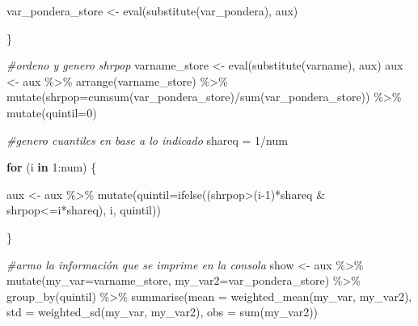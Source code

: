 \documentclass[
]{book}
\newenvironment{Shaded}{\begin{snugshade}}{\end{snugshade}}
\newcommand{\AttributeTok}[1]{\textcolor[rgb]{0.77,0.63,0.00}{#1}}
\newcommand{\CommentTok}[1]{\textcolor[rgb]{0.56,0.35,0.01}{\textit{#1}}}
\newcommand{\ControlFlowTok}[1]{\textcolor[rgb]{0.13,0.29,0.53}{\textbf{#1}}}
\newcommand{\DecValTok}[1]{\textcolor[rgb]{0.00,0.00,0.81}{#1}}
\newcommand{\FunctionTok}[1]{\textcolor[rgb]{0.00,0.00,0.00}{#1}}
\newcommand{\NormalTok}[1]{#1}
\newcommand{\OtherTok}[1]{\textcolor[rgb]{0.56,0.35,0.01}{#1}}
\newcommand{\SpecialCharTok}[1]{\textcolor[rgb]{0.00,0.00,0.00}{#1}}
\begin{document}
\begin{Shaded}
\begin{Highlighting}[numbers=left,,]
\NormalTok{    var\_pondera\_store }\OtherTok{\textless{}{-}} \FunctionTok{eval}\NormalTok{(}\FunctionTok{substitute}\NormalTok{(var\_pondera), aux)}
    
\NormalTok{  \}}
  
  
  \CommentTok{\#ordeno y genero shrpop}
\NormalTok{  varname\_store }\OtherTok{\textless{}{-}} \FunctionTok{eval}\NormalTok{(}\FunctionTok{substitute}\NormalTok{(varname), aux)}
\NormalTok{  aux }\OtherTok{\textless{}{-}}\NormalTok{ aux }\SpecialCharTok{\%\textgreater{}\%} \FunctionTok{arrange}\NormalTok{(varname\_store) }\SpecialCharTok{\%\textgreater{}\%} 
    \FunctionTok{mutate}\NormalTok{(}\AttributeTok{shrpop=}\FunctionTok{cumsum}\NormalTok{(var\_pondera\_store)}\SpecialCharTok{/}\FunctionTok{sum}\NormalTok{(var\_pondera\_store)) }\SpecialCharTok{\%\textgreater{}\%}
    \FunctionTok{mutate}\NormalTok{(}\AttributeTok{quintil=}\DecValTok{0}\NormalTok{)}
  
  \CommentTok{\#genero cuantiles en base a lo indicado}
\NormalTok{  shareq }\OtherTok{=} \DecValTok{1}\SpecialCharTok{/}\NormalTok{num}
  
  \ControlFlowTok{for}\NormalTok{ (i }\ControlFlowTok{in} \DecValTok{1}\SpecialCharTok{:}\NormalTok{num) \{}
    
\NormalTok{    aux }\OtherTok{\textless{}{-}}\NormalTok{ aux }\SpecialCharTok{\%\textgreater{}\%} \FunctionTok{mutate}\NormalTok{(}\AttributeTok{quintil=}\FunctionTok{ifelse}\NormalTok{((shrpop}\SpecialCharTok{\textgreater{}}\NormalTok{(i}\DecValTok{{-}1}\NormalTok{)}\SpecialCharTok{*}\NormalTok{shareq }\SpecialCharTok{\&}\NormalTok{ shrpop}\SpecialCharTok{\textless{}=}\NormalTok{i}\SpecialCharTok{*}\NormalTok{shareq), i, quintil))}
    
\NormalTok{  \}}
  
  
  \CommentTok{\#armo la información que se imprime en la consola}
\NormalTok{  show }\OtherTok{\textless{}{-}}\NormalTok{ aux }\SpecialCharTok{\%\textgreater{}\%} \FunctionTok{mutate}\NormalTok{(}\AttributeTok{my\_var=}\NormalTok{varname\_store,}
                         \AttributeTok{my\_var2=}\NormalTok{var\_pondera\_store) }\SpecialCharTok{\%\textgreater{}\%} \FunctionTok{group\_by}\NormalTok{(quintil) }\SpecialCharTok{\%\textgreater{}\%}
                  \FunctionTok{summarise}\NormalTok{(}\AttributeTok{mean =} \FunctionTok{weighted\_mean}\NormalTok{(my\_var, my\_var2),}
                             \AttributeTok{std =} \FunctionTok{weighted\_sd}\NormalTok{(my\_var, my\_var2),}
                             \AttributeTok{obs =} \FunctionTok{sum}\NormalTok{(my\_var2))}
  

\end{Highlighting}
\end{Shaded}
\end{document}
